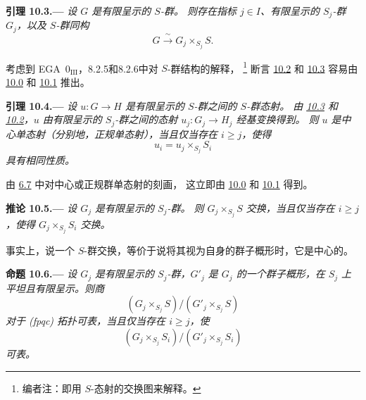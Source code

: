 
\medskip
{}\label{lem:sga3-VIB-10.3}%
\noindent\textbf{引理 10.3.---}
\emph{设 \(G\) 是有限呈示的 \(S\)-群。
则存在指标 \(j\in I\)、有限呈示的 \(S_j\)-群 \(G_j\)，以及 \(S\)-群同构}
\[
  G\xrightarrow{\ \sim\ }G_j\times_{S_j}S.
\]

考虑到 EGA~0\(_{\mathrm{III}}\)，8.2.5和8.2.6中对 \(S\)-群结构的解释，%
\footnote{\label{note:sga3-VIB-93}编者注：即用 \(S\)-态射的交换图来解释。}
断言 \hyperref[lem:sga3-VIB-10.2]{10.2} 和
\hyperref[lem:sga3-VIB-10.3]{10.3} 容易由
\hyperref[par:sga3-VIB-10.0]{10.0} 和
\hyperref[par:sga3-VIB-10.1]{10.1} 推出。

\medskip
{}\label{lem:sga3-VIB-10.4}%
\noindent\textbf{引理 10.4.---}
\emph{设 \(u:G\to H\) 是有限呈示的 \(S\)-群之间的 \(S\)-群态射。
由 \hyperref[lem:sga3-VIB-10.3]{10.3} 和
\hyperref[lem:sga3-VIB-10.2]{10.2}，\(u\) 由有限呈示的
\(S_j\)-群之间的态射 \(u_j:G_j\to H_j\) 经基变换得到。
则 \(u\) 是中心单态射\textup{（分别地，正规单态射）}，当且仅当存在
\(i\geq j\)，使得}
\label{form:sga3-VIB-10.4-base-change}%
\[
  u_i=u_j\times_{S_j}S_i
\]
\emph{具有相同性质。}

由 \hyperref[rem:sga3-VIB-6.7]{6.7} 中对中心或正规群单态射的刻画，
这立即由 \hyperref[par:sga3-VIB-10.0]{10.0} 和
\hyperref[par:sga3-VIB-10.1]{10.1} 得到。

\medskip
{}\label{cor:sga3-VIB-10.5}%
\noindent\textbf{推论 10.5.---}
\emph{设 \(G_j\) 是有限呈示的 \(S_j\)-群。
则 \(G_j\times_{S_j}S\) 交换，当且仅当存在 \(i\geq j\)，使得
\(G_j\times_{S_j}S_i\) 交换。}

事实上，说一个 \(S\)-群交换，等价于说将其视为自身的群子概形时，它是中心的。

\medskip
{}\label{prop:sga3-VIB-10.6}%
\noindent\textbf{命题 10.6.---}
\emph{设 \(G_j\) 是有限呈示的 \(S_j\)-群，\(G'_j\) 是
\(G_j\) 的一个群子概形，在 \(S_j\) 上平坦且有限呈示。则商}
\label{form:sga3-VIB-10.6-quotient-over-S}%
\[
  (G_j\times_{S_j}S)/(G'_j\times_{S_j}S)
\]
\emph{对于 \textup{(fpqc)} 拓扑可表，当且仅当存在 \(i\geq j\)，使}
\label{form:sga3-VIB-10.6-quotient-over-Si}%
\[
  (G_j\times_{S_j}S_i)/(G'_j\times_{S_j}S_i)
\]
\emph{可表。}

